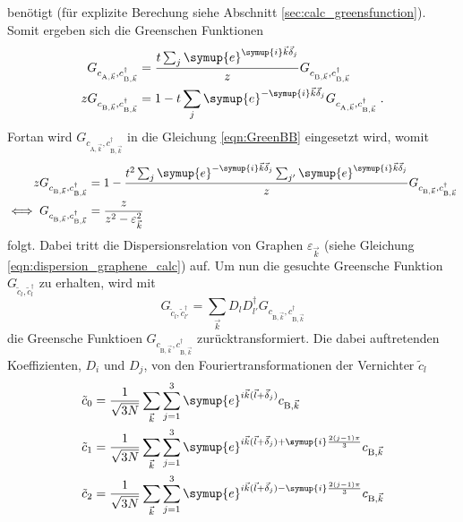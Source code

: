 benötigt (für explizite Berechung siehe Abschnitt \ref{sec:calc_greensfunction}).
Somit ergeben sich die Greenschen Funktionen
\begin{align}
    G_{c_{\text{A},\vec{k}}, c^\dagger_{\text{B},\vec{k}}} &=  \frac{t\sum_j \symup{e}^{\symup{i}\vec{k}\vec{\delta}_j}}{z} G_{c_{\text{B},\vec{k}}, c^\dagger_{\text{B},\vec{k}}}\\
    zG_{c_{\text{B},\vec{k}}, c^\dagger_{\text{B},\vec{k}}} &= 1 -  t\sum_j \symup{e}^{-\symup{i}\vec{k}\vec{\delta}_j} G_{c_{\text{A},\vec{k}}, c^\dagger_{\text{B},\vec{k}}} \; . \label{eqn:GreenBB}
\end{align}
Fortan wird $G_{c_{\text{A},\vec{k}}, c^\dagger_{\text{B},\vec{k}}}$ in die Gleichung \eqref{eqn:GreenBB} eingesetzt wird, womit
\begin{align}
    zG_{c_{\text{B},\vec{k}}, c^\dagger_{\text{B},\vec{k}}} &= 1 - \frac{t^2\sum_j \symup{e}^{-\symup{i}\vec{k}\vec{\delta}_j} \sum_{j'} \symup{e}^{\symup{i}\vec{k}\vec{\delta}_{j}} }{z} G_{c_{\text{B},\vec{k}}, c^\dagger_{\text{B},\vec{k}}} \\
    \iff G_{c_{\text{B},\vec{k}}, c^\dagger_{\text{B},\vec{k}}} &= \frac{z}{z^2 - \varepsilon^2_{\vec{k}}  } \; 
\end{align}
folgt. 
Dabei tritt die Dispersionsrelation von Graphen $\varepsilon_{\vec{k}}$ (siehe Gleichung \eqref{eqn:dispersion_graphene_calc}) auf. 
Um nun die gesuchte Greensche Funktion $G_{\tilde{c}_l, \tilde{c}_l^{\dagger}}$ zu erhalten, wird mit 
\begin{equation}
    G_{\tilde{c}_l, \tilde{c}^\dagger_{l'}} = \sum_{\vec{k}} D_l D^\dagger_{l'} G_{c_{\text{B},\vec{k}}, c^\dagger_{\text{B},\vec{k}}} \label{eqn:koe}
\end{equation}
die Greensche Funktioen $G_{c_{\text{B},\vec{k}}, c^\dagger_{\text{B},\vec{k}}}$ zurücktransformiert.
Die dabei auftretenden Koeffizienten, $D_i$ und $D_j$, von den Fouriertransformationen der Vernichter $\tilde{c}_l$
\begin{align*}
    \tilde{c}_0 &= \frac{1}{\sqrt{3N}}\sum_{\vec{k}} \sum_{j=1}^3\symup{e}^{i{\vec{k}}(\vec{l}+\vec{\delta}_j)}                              c_{\text{B}, \vec{k}}  \\
    \tilde{c}_1 &= \frac{1}{\sqrt{3N}}\sum_{\vec{k}} \sum_{j=1}^3\symup{e}^{i{\vec{k}}(\vec{l}+\vec{\delta}_j)+\symup{i}\frac{2(j-1)\pi}{3}} c_{\text{B}, \vec{k}}  \\
    \tilde{c}_2 &= \frac{1}{\sqrt{3N}}\sum_{\vec{k}} \sum_{j=1}^3\symup{e}^{i{\vec{k}}(\vec{l}+\vec{\delta}_j)-\symup{i}\frac{2(j-1)\pi}{3}} c_{\text{B}, \vec{k}}  
\end{align*}
